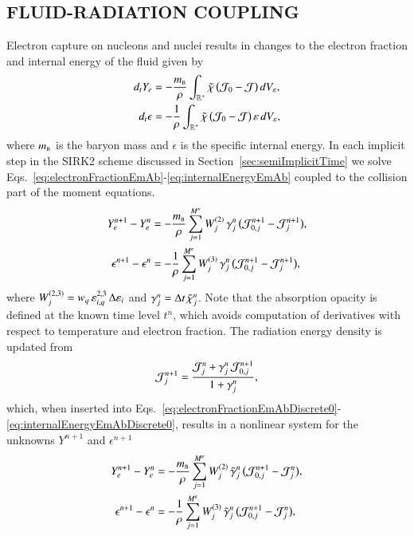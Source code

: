 \documentclass[11pt,letterpaper,twoside,english,final]{article}
\begin{document}
\subsection{FLUID-RADIATION COUPLING}

\label{sec:couplingElectronCapture}

Electron capture on nucleons and nuclei results in changes to the electron fraction and internal energy of the fluid given by
\begin{align}
  d_{t}Y_{e}
  &=-\frac{m_{\mbox{\tiny B}}}{\rho}\int_{\mathbb{R}^{+}}\tilde{\chi}\,\big(\mathcal{J}_{0}-\mathcal{J}\big)\,dV_{\varepsilon}, \label{eq:electronFractionEmAb} \\
  d_{t}\epsilon
  &=-\frac{1}{\rho}\int_{\mathbb{R}^{+}}\tilde{\chi}\,\big(\mathcal{J}_{0}-\mathcal{J}\big)\,\varepsilon\,dV_{\varepsilon}, \label{eq:internalEnergyEmAb}
\end{align}
where $m_{\mbox{\tiny B}}$ is the baryon mass and $\epsilon$ is the specific internal energy.  
In each implicit step in the SIRK2 scheme discussed in Section~\ref{sec:semiImplicitTime} we solve Eqs.~\eqref{eq:electronFractionEmAb}-\eqref{eq:internalEnergyEmAb} coupled to the collision part of the moment equations.  
\begin{align}
  Y_{e}^{n+1}-Y_{e}^{n}
  &=-\frac{m_{\mbox{\tiny B}}}{\rho}\sum_{j=1}^{M^{\varepsilon}}W_{j}^{(2)}\,\gamma_{j}^{n}\,\big(\mathcal{J}_{0,j}^{n+1}-\mathcal{J}_{j}^{n+1}\big), \label{eq:electronFractionEmAbDiscrete0} \\
  \epsilon^{n+1}-\epsilon^{n}
  &=-\frac{1}{\rho}\sum_{j=1}^{M^{\varepsilon}}W_{j}^{(3)}\,\gamma_{j}^{n}\,\big(\mathcal{J}_{0,j}^{n+1}-\mathcal{J}_{j}^{n+1}\big), \label{eq:internalEnergyEmAbDiscrete0}
\end{align}
where $W_{j}^{(2,3)}=w_{q}\,\varepsilon_{i,q}^{2,3}\,\Delta\varepsilon_{i}$ and $\gamma_{j}^{n}=\Delta t\,\tilde{\chi}_{j}^{n}$.  
Note that the absorption opacity is defined at the known time level $t^{n}$, which avoids computation of derivatives with respect to temperature and electron fraction.  
The radiation energy density is updated from
\begin{equation}
  \mathcal{J}_{j}^{n+1}=\frac{\mathcal{J}_{j}^{n}+\gamma_{j}^{n}\,\mathcal{J}_{0,j}^{n+1}}{1+\gamma_{j}^{n}}, 
  \label{eq:momentEquationEnergyEmAbDiscrete}
\end{equation}
which, when inserted into Eqs.~\eqref{eq:electronFractionEmAbDiscrete0}-\eqref{eq:internalEnergyEmAbDiscrete0}, results in a nonlinear system for the unknowns $Y^{n+1}$ and $\epsilon^{n+1}$
\begin{align}
  Y_{e}^{n+1}-Y_{e}^{n}
  &=-\frac{m_{\mbox{\tiny B}}}{\rho}\sum_{j=1}^{M^{\varepsilon}}W_{j}^{(2)}\,\tilde{\gamma}_{j}^{n}\,\big(\mathcal{J}_{0,j}^{n+1}-\mathcal{J}_{j}^{n}\big), \label{eq:electronFractionEmAbDiscrete} \\
  \epsilon^{n+1}-\epsilon^{n}
  &=-\frac{1}{\rho}\sum_{j=1}^{M^{\varepsilon}}W_{j}^{(3)}\,\tilde{\gamma}_{j}^{n}\,\big(\mathcal{J}_{0,j}^{n+1}-\mathcal{J}_{j}^{n}\big), \label{eq:internalEnergyEmAbDiscrete}
\end{align}
\end{document}
